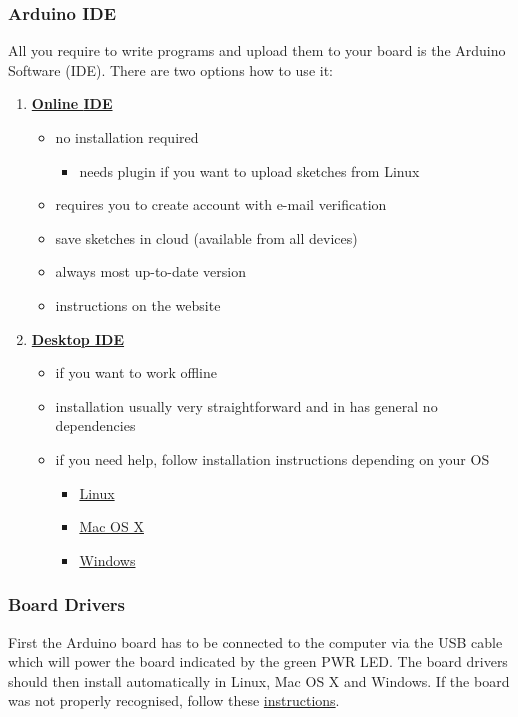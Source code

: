 \subsubsection{Arduino \acs{IDE}}
All you require to write programs and upload them to your board is the Arduino Software (\ac{IDE}). There are two options how to use it:\newpage
%
\begin{enumerate}
  \item \href{https://create.arduino.cc}{\textbf{Online \ac{IDE}}}
  \begin{itemize}
    \item no installation required
    \begin{itemize}
      \item needs plugin if you want to upload sketches from Linux
    \end{itemize}
    \item requires you to create account with e-mail verification
    \item save sketches in cloud (available from all devices)
    \item always most up-to-date version
    \item instructions on the website
  \end{itemize}
%
  \item \href{https://www.arduino.cc/en/Main/Software#download}{\textbf{Desktop \ac{IDE}}}
  \begin{itemize}
    \item if you want to work offline
    \item installation usually very straightforward and in has general no dependencies
    \item if you need help, follow installation instructions depending on your \ac{OS}
    \begin{itemize}
      \item \href{https://www.arduino.cc/en/Guide/Linux}{Linux}
      \item \href{https://www.arduino.cc/en/Guide/MacOSX}{Mac OS X}
      \item \href{https://www.arduino.cc/en/Guide/Windows}{Windows}
    \end{itemize}
  \end{itemize}
\end{enumerate}
%
\subsubsection{Board Drivers}
First the Arduino board has to be connected to the computer via the \ac{USB} cable which will power the board indicated by the green \ac{PWR} LED. The board drivers should then install automatically in Linux, Mac OS X and Windows. If the board was not properly recognised, follow these \href{https://www.arduino.cc/en/Guide/ArduinoUno}{instructions}.
%

